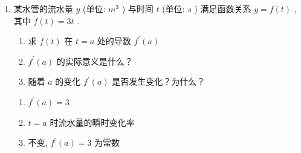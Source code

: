 \begin{enumerate}
    \item 某水管的流水量 ${y}$ (单位: ${{m}}^{3}$ ) 与时间 ${t}$ (单位: ${s}$ ) 满足函数关系 ${y} = {f}\left( {t}\right)$ , 其中 ${f}\left( {t}\right)  = 3{t}$ .
    \begin{enumerate}
        \item 求 ${f}\left( {t}\right)$ 在 ${t} = {a}$ 处的导数 ${{f}}^{\prime }\left( {a}\right)$
        \item ${{f}}^{\prime }\left( {a}\right)$ 的实际意义是什么？
        \item 随着 ${a}$ 的变化 ${{f}}^{\prime }\left( {a}\right)$ 是否发生变化？为什么？
    \end{enumerate}
    \begin{jieda}
        \begin{enumerate}
            \item ${f}^{\prime }\left( a\right)  = 3$
            \item $t = a$ 时流水量的瞬时变化率
            \item 不变, ${f}^{\prime }\left( a\right)  = 3$ 为常数
        \end{enumerate}
    \end{jieda}
\end{enumerate}
\clearpage

